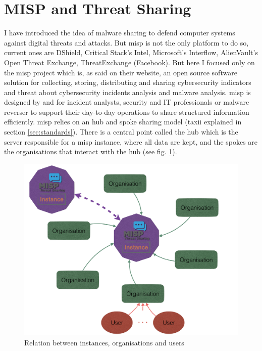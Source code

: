 \documentclass{eplmastersthesis}
\begin{document}
\section{MISP and Threat Sharing}
I have introduced the idea of malware sharing to defend computer systems against digital threats and attacks. But \gls{misp} is not the only platform to do so, current ones are DShield, Critical Stack’s Intel, Microsoft’s Interflow, AlienVault’s Open Threat Exchange, ThreatExchange (Facebook).
But here I focused only on the \gls{misp} project which is, as said on their website, an open source software solution for collecting, storing, distributing and sharing cybersecurity indicators and threat about cybersecurity incidents analysis and malware analysis. \gls{misp} is designed by and for incident analysts, security and IT professionals or malware reverser to support their day-to-day operations to share structured information efficiently.
\gls{misp} relies on an hub and spoke sharing model (\gls{taxii} \cite{taxiiWebsite} explained in section \ref{sec:standards}). There is a central point called the hub which is the server responsible for a \gls{misp} instance, where all data are kept, and the spokes are the organisations that interact with the hub (see fig. \ref{misp-organisations}).\\

\begin{figure}
\centering
\includegraphics[scale=0.4]{res/misp-organisations}
\caption{Relation between instances, organisations and users}
\label{misp-organisations}
\end{figure}
\end{document}
